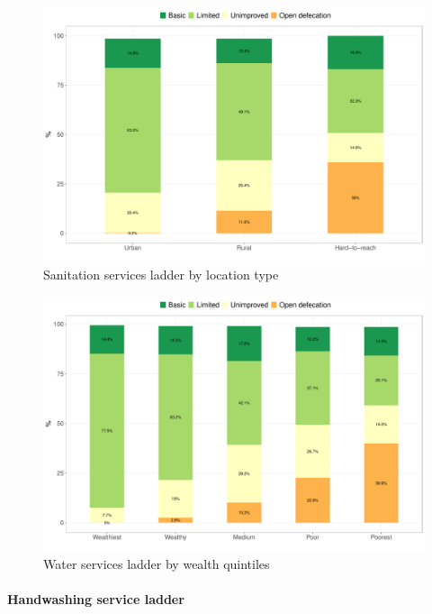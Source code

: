 \documentclass[12pt,a4paper]{article}
\let\oldparagraph\paragraph
\renewcommand{\paragraph}[1]{\oldparagraph{#1}\mbox{}}
\begin{document}
\newpage

\begin{figure}[H]

{\centering \includegraphics{kayinReport_files/figure-latex/san1plot-1} 

}

\caption{Sanitation services ladder by location type}\label{fig:san1plot}
\end{figure}

\begin{figure}[H]

{\centering \includegraphics{kayinReport_files/figure-latex/san2plot-1} 

}

\caption{Water services ladder by wealth quintiles}\label{fig:san2plot}
\end{figure}

\hypertarget{handwashing-service-ladder}{%
\paragraph{Handwashing service ladder}\label{handwashing-service-ladder}}
\end{document}
